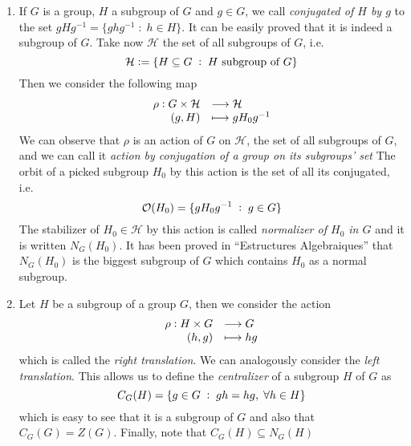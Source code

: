 \documentclass[../main.tex]{subfiles}
\begin{document}
\begin{ej}
\begin{enumerate}[(1)]
    \item If $G$ is a group, $H$ a subgroup of $G$ and $g\in G$, we call \textit{conjugated of $H$ by $g$} to the set $gHg^{-1} = \{ghg^{-1}\;:\;h\in H\}$. It can be easily proved that it is indeed a subgroup of $G$. Take now $\mathcal{H}$ the set of all subgroups of $G$, i.e.
    \begin{equation}
        \notag
        \mathcal{H}:= \{H\subseteq G\;:\;\text{$H$ subgroup of $G$}\}
    \end{equation}
    Then we consider the following map
    \begin{equation}
        \notag
        \begin{array}{rl}
            \rho:G\times\mathcal{H} & \longrightarrow \mathcal{H} \\
            (g,H) & \longmapsto gH_0g^{-1}
        \end{array}
    \end{equation}
    We can observe that $\rho$ is an action of $G$ on $\mathcal{H}$, the set of all subgroups of $G$, and we can call it \textit{action by conjugation of a group on its subgroups' set} The orbit of a picked subgroup $H_0$ by this action is the set of all its conjugated, i.e.
    \begin{equation}
        \notag
        \mathcal{O}(H_0) = \{gH_0g^{-1}\;:\;g\in G\}
    \end{equation}
    The stabilizer of $H_0\in\mathcal{H}$ by this action is called \textit{normalizer of $H_0$ in $G$} and it is written $N_G(H_0)$. It has been proved in ``Estructures Algebraiques'' that $N_G(H_0)$ is the biggest subgroup of $G$ which contains $H_0$ as a normal subgroup.
    
    \item Let $H$ be a subgroup of a group $G$, then we consider the action 
    \begin{equation}
        \notag
        \begin{array}{rl}
            \rho:H\times G & \longrightarrow G \\
            (h,g) & \longmapsto hg
        \end{array}
    \end{equation}
    which is called the \textit{right translation}. We can analogously consider the \textit{left translation}. This allows us to define the \textit{centralizer} of a subgroup $H$ of $G$ as
    \begin{equation}
        \notag
        C_G(H) = \{g\in G\;:\;gh = hg,\;\forall h\in H\}
    \end{equation}
    which is easy to see that it is a subgroup of $G$ and also that $C_G(G) = Z(G)$. Finally, note that $C_G(H)\subseteq N_G(H)$
\end{enumerate}
\end{ej}
\end{document}
